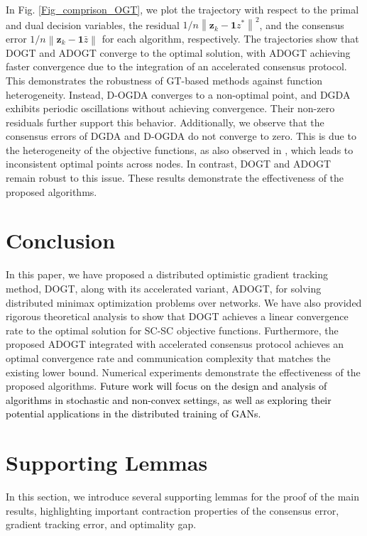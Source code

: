 \documentclass[letterpaper, 10 pt, conference]{ieeeconf}
\def \hy #1{\textcolor{black}{#1}}
\begin{document}
In Fig. \ref{Fig_comprison_OGT}, we plot the trajectory with respect to the primal and dual decision variables, the residual $1/n\left\| \mathbf{z}_k-\mathbf{1}z^* \right\| ^2$, and the consensus error $1/n\left\| \mathbf{z}_k-\mathbf{1}\bar{z} \right\|$ for each algorithm, respectively. 
The trajectories show that DOGT and ADOGT converge to the optimal solution, with ADOGT achieving faster convergence due to the integration of an accelerated consensus protocol. This demonstrates the robustness of GT-based methods against function heterogeneity. Instead, D-OGDA converges to a non-optimal point, and DGDA exhibits periodic oscillations without achieving convergence. Their non-zero residuals further support this behavior. 
Additionally, we observe that the consensus errors of DGDA and D-OGDA do not converge to zero. This is due to the heterogeneity of the objective functions, as also observed in \cite{cai2024diffusion}, which leads to inconsistent optimal points across nodes. In contrast, DOGT and ADOGT remain robust to this issue. These results demonstrate the effectiveness of the proposed algorithms.


\section{Conclusion}\label{Sec_conclusion}
In this paper, we have proposed a distributed optimistic gradient tracking method, DOGT, along with its accelerated variant, ADOGT, for solving distributed minimax optimization problems over networks. We have also provided rigorous theoretical analysis to show that DOGT achieves a linear convergence rate to the optimal solution for SC-SC objective functions. Furthermore, the proposed ADOGT integrated with accelerated consensus protocol achieves an optimal convergence rate and communication complexity that matches the existing lower bound. Numerical experiments demonstrate the effectiveness of the proposed algorithms. \hy{Future work will focus on the design and analysis of algorithms in stochastic and non-convex settings, as well as exploring their potential applications in the distributed training of GANs.}

\appendix
\section{Supporting Lemmas}
In this section, we introduce several supporting lemmas for the proof of the main results, highlighting important contraction properties of the consensus error, gradient tracking error, and optimality gap.
\end{document}
